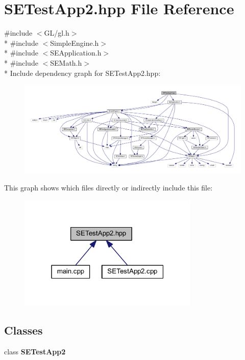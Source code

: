 \section{S\+E\+Test\+App2.\+hpp File Reference}
\label{_s_e_test_app2_8hpp}
{\ttfamily \#include $<$G\+L/gl.\+h$>$}\\*
{\ttfamily \#include $<$Simple\+Engine.\+h$>$}\\*
{\ttfamily \#include $<$S\+E\+Application.\+h$>$}\\*
{\ttfamily \#include $<$S\+E\+Math.\+h$>$}\\*
Include dependency graph for S\+E\+Test\+App2.\+hpp\+:
\nopagebreak
\begin{figure}[H]
\begin{center}
\leavevmode
\includegraphics[width=350pt]{_s_e_test_app2_8hpp__incl}
\end{center}
\end{figure}
This graph shows which files directly or indirectly include this file\+:
\nopagebreak
\begin{figure}[H]
\begin{center}
\leavevmode
\includegraphics[width=244pt]{_s_e_test_app2_8hpp__dep__incl}
\end{center}
\end{figure}
\subsection*{Classes}
\begin{DoxyCompactItemize}
\item 
class {\bf S\+E\+Test\+App2}
\end{DoxyCompactItemize}
